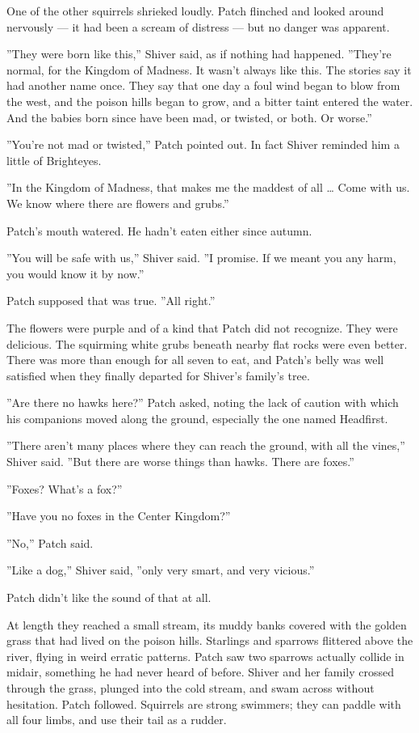 \documentclass[12pt]{book}
\begin{document}
One of the other squirrels shrieked loudly. Patch flinched and looked around nervously ---
it had been a scream of distress ---
but no danger was apparent.

''They were born like this,'' Shiver said, as if nothing had happened. ''They're normal, for the Kingdom of Madness. It wasn't always like this. The stories say it had another name once. They say that one day a foul wind began to blow from the west, and the poison hills began to grow, and a bitter taint entered the water. And the babies born since have been mad, or twisted, or both. Or worse.''

''You're not mad or twisted,'' Patch pointed out. In fact Shiver reminded him a little of Brighteyes.

''In the Kingdom of Madness, that makes me the maddest of all \ldots{}
Come with us. We know where there are flowers and grubs.''

Patch's mouth watered. He hadn't eaten either since autumn.

''You will be safe with us,'' Shiver said. ''I promise. If we meant you any harm, you would know it by now.''

Patch supposed that was true. ''All right.''

The flowers were purple and of a kind that Patch did not recognize. They were delicious. The squirming white grubs beneath nearby flat rocks were even better. There was more than enough for all seven to eat, and Patch's belly was well satisfied when they finally departed for Shiver's family's tree.

''Are there no hawks here?'' Patch asked, noting the lack of caution with which his companions moved along the ground, especially the one named Headfirst. 

''There aren't many places where they can reach the ground, with all the vines,'' Shiver said. ''But there are worse things than hawks. There are foxes.''

''Foxes? What's a fox?''

''Have you no foxes in the Center Kingdom?''

''No,'' Patch said.

''Like a dog,'' Shiver said, ''only very smart, and very vicious.''

Patch didn't like the sound of that at all.

At length they reached a small stream, its muddy banks covered with the golden grass that had lived on the poison hills. Starlings and sparrows flittered above the river, flying in weird erratic patterns. Patch saw two sparrows actually collide in midair, something he had never heard of before. Shiver and her family crossed through the grass, plunged into the cold stream, and swam across without hesitation. Patch followed. Squirrels are strong swimmers; they can paddle with all four limbs, and use their tail as a rudder.
\end{document}
